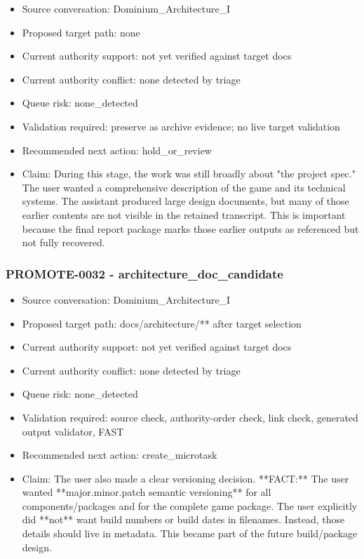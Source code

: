 \documentclass[11pt,a4paper]{report}
\begin{document}
\begin{itemize}
\item Source conversation: Dominium\_Architecture\_I
\item Proposed target path: none
\item Current authority support: not yet verified against target docs
\item Current authority conflict: none detected by triage
\item Queue risk: none\_detected
\item Validation required: preserve as archive evidence; no live target validation
\item Recommended next action: hold\_or\_review
\item Claim: During this stage, the work was still broadly about "the project spec." The user wanted a comprehensive description of the game and its technical systems. The assistant produced large design documents, but many of those earlier contents are not visible in the retained transcript. This is important because the final report package marks those earlier outputs as referenced but not fully recovered.
\end{itemize}

\subsubsection{PROMOTE-0032 - architecture\_doc\_candidate}

\begin{itemize}
\item Source conversation: Dominium\_Architecture\_I
\item Proposed target path: docs/architecture/** after target selection
\item Current authority support: not yet verified against target docs
\item Current authority conflict: none detected by triage
\item Queue risk: none\_detected
\item Validation required: source check, authority-order check, link check, generated output validator, FAST
\item Recommended next action: create\_microtask
\item Claim: The user also made a clear versioning decision. **FACT:** The user wanted **major.minor.patch semantic versioning** for all components/packages and for the complete game package. The user explicitly did **not** want build numbers or build dates in filenames. Instead, those details should live in metadata. This became part of the future build/package design.
\end{itemize}
\end{document}
